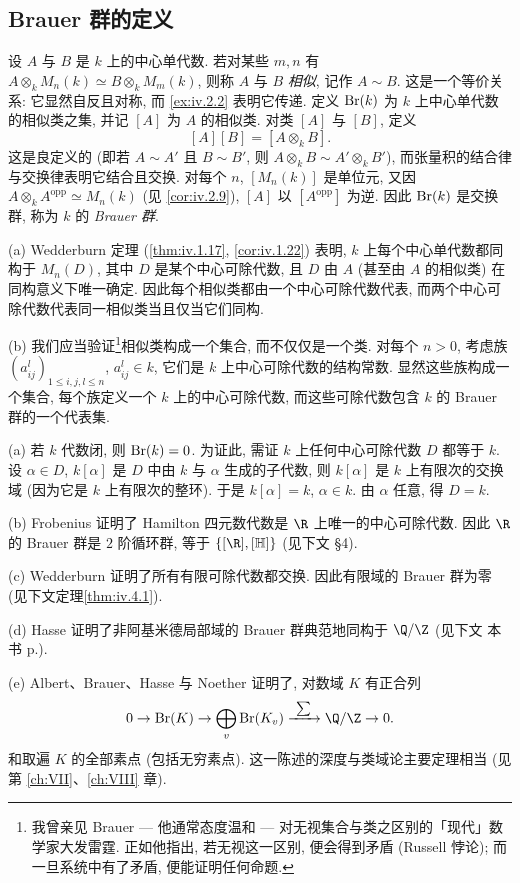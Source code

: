 \subsection*{Brauer 群的定义}

设 $A$ 与 $B$ 是 $k$ 上的中心单代数. 若对某些 $m,n$ 有 $A\otimes_k M_n(k)\simeq B\otimes_k M_m(k)$, 则称 $A$ 与 $B$ \emph{相似}, 记作 $A\sim B$. 这是一个等价关系: 它显然自反且对称, 而 \ref{ex:iv.2.2} 表明它传递. 定义 $\operatorname{Br}(k)$ 为 $k$ 上中心单代数的相似类之集, 并记 $[A]$ 为 $A$ 的相似类. 对类 $[A]$ 与 $[B]$, 定义
\[
[A][B]=[A\otimes_{k}B].
\]
这是良定义的 (即若 $A\sim A'$ 且 $B\sim B'$, 则 $A\otimes_k B\sim A'\otimes_k B'$), 而张量积的结合律与交换律表明它结合且交换. 对每个 $n$, $[M_n(k)]$ 是单位元, 又因 $A\otimes_k A^{\mathrm{opp}}\simeq M_n(k)$ (见 \ref{cor:iv.2.9}), $[A]$ 以 $[A^{\mathrm{opp}}]$ 为逆. 因此 $\operatorname{Br}(k)$ 是交换群, 称为 $k$ 的 \emph{Brauer 群}.

\begin{remark}\label{rem:iv.2.13}
(a) Wedderburn 定理 (\ref{thm:iv.1.17}, \ref{cor:iv.1.22}) 表明, $k$ 上每个中心单代数都同构于 $M_n(D)$, 其中 $D$ 是某个中心可除代数, 且 $D$ 由 $A$ (甚至由 $A$ 的相似类) 在同构意义下唯一确定. 因此每个相似类都由一个中心可除代数代表, 而两个中心可除代数代表同一相似类当且仅当它们同构.

(b) 我们应当验证\footnote{我曾亲见 Brauer — 他通常态度温和 — 对无视集合与类之区别的「现代」数学家大发雷霆. 正如他指出, 若无视这一区别, 便会得到矛盾 (Russell 悖论); 而一旦系统中有了矛盾, 便能证明任何命题.}相似类构成一个集合, 而不仅仅是一个类. 对每个 $n>0$, 考虑族 $(a_{ij}^{l})_{1\le i,j,l\le n}$, $a_{ij}^{l}\in k$, 它们是 $k$ 上中心可除代数的结构常数. 显然这些族构成一个集合, 每个族定义一个 $k$ 上的中心可除代数, 而这些可除代数包含 $k$ 的 Brauer 群的一个代表集.
\end{remark}

\begin{example}\label{ex:iv.2.14}
(a) 若 $k$ 代数闭, 则 $\operatorname{Br}(k)=0$. 为证此, 需证 $k$ 上任何中心可除代数 $D$ 都等于 $k$. 设 $\alpha\in D$, $k[\alpha]$ 是 $D$ 中由 $k$ 与 $\alpha$ 生成的子代数, 则 $k[\alpha]$ 是 $k$ 上有限次的交换域 (因为它是 $k$ 上有限次的整环). 于是 $k[\alpha]=k$, $\alpha\in k$. 由 $\alpha$ 任意, 得 $D=k$.

(b) Frobenius 证明了 Hamilton 四元数代数是 $\R$ 上唯一的中心可除代数. 因此 $\R$ 的 Brauer 群是 $2$ 阶循环群, 等于 $\{[\R],[\mathbb{H}]\}$ (见下文 \S 4).

(c) Wedderburn 证明了所有有限可除代数都交换. 因此有限域的 Brauer 群为零 (见下文定理\ref{thm:iv.4.1}).

(d) Hasse 证明了非阿基米德局部域的 Brauer 群典范地同构于 $\Q/\Z$ (见下文 本书 p.\pageref{sec:IV.4}).

(e) Albert、Brauer、Hasse 与 Noether 证明了, 对数域 $K$ 有正合列
\[
0\to\Br(K)\to\bigoplus_{v}\Br(K_{v})\xrightarrow{\ \sum\ }\Q/\Z\to0.
\]
和取遍 $K$ 的全部素点 (包括无穷素点). 这一陈述的深度与类域论主要定理相当 (见第 \ref{ch:VII}、\ref{ch:VIII} 章).
\end{example}

